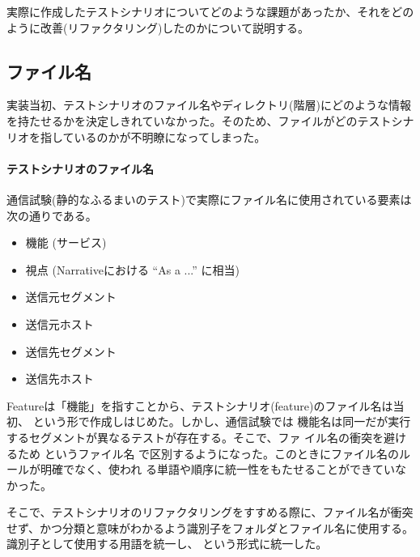 実際に作成したテストシナリオについてどのような課題があったか、それをどの
ように改善(リファクタリング)したのかについて説明する。

  \subsection{ファイル名}
  \label{sec:refactor-filename}

実装当初、テストシナリオのファイル名やディレクトリ(階層)にどのような情報
を持たせるかを決定しきれていなかった。そのため、ファイルがどのテストシナ
リオを指しているのかが不明瞭になってしまった。

    \paragraph{テストシナリオのファイル名}
通信試験(静的なふるまいのテスト)で実際にファイル名に使用されている要素は
次の通りである。
\begin{itemize}
 \item 機能 (サービス)
 \item 視点 (Narrativeにおける ``As a ...'' に相当)
 \item 送信元セグメント
 \item 送信元ホスト
 \item 送信先セグメント
 \item 送信先ホスト
\end{itemize}
Featureは「機能」を指すことから、テストシナリオ(feature)のファイル名は当
初、 という形で作成しはじめた。しかし、通信試験では
機能名は同一だが実行するセグメントが異なるテストが存在する。そこで、ファ
イル名の衝突を避けるため  というファイル名
で区別するようになった。このときにファイル名のルールが明確でなく、使われ
る単語や順序に統一性をもたせることができていなかった。

そこで、テストシナリオのリファクタリングをすすめる際に、ファイル名が衝突
せず、かつ分類と意味がわかるよう識別子をフォルダとファイル名に使用する。
識別子として使用する用語を統一し、
という形式に統一した。

